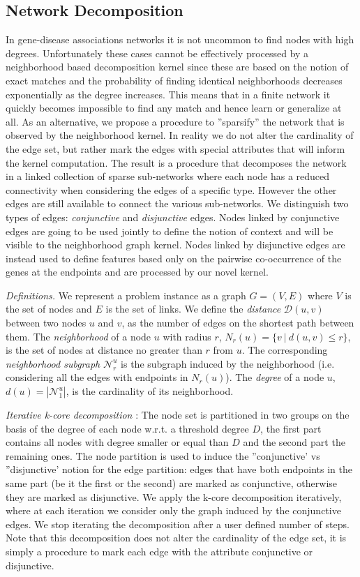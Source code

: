 \documentclass[review]{elsarticle}
\begin{document}
\subsection{Network Decomposition} 
In gene-disease associations networks it is not uncommon to find nodes with high degrees. Unfortunately these cases cannot be effectively processed by a neighborhood based decomposition kernel since these are based on the notion of exact matches and the probability of finding identical neighborhoods decreases exponentially as the degree increases. This means that in a finite network it quickly becomes impossible to find any match and hence learn or generalize at all. As an alternative, we propose a procedure to ''sparsify'' the network that is observed by the neighborhood kernel. In reality we do not alter the cardinality of the edge set, but rather mark the edges with special attributes that will inform the kernel computation. The result is a procedure that decomposes the network in a linked collection of sparse sub-networks where each node has a reduced connectivity when considering the edges of a specific type. However the other edges are still available to connect the various sub-networks. We distinguish two types of edges: {\em conjunctive} and {\em disjunctive} edges. Nodes linked by conjunctive edges are going to be used jointly to define the notion of context and will be visible to the neighborhood graph kernel. Nodes linked by disjunctive edges are instead used to define features based only on the pairwise co-occurrence of the genes at the endpoints and are processed by our novel kernel.

\textit{Definitions.} 
We represent a problem instance as a graph $G=(V,E)$ where $V$ is the set of nodes and $E$ is the set of links.
We define the \textit{distance} $\mathcal{D}(u,v)$ between two nodes $u$ and $v$, as the number of edges on the shortest path between them. The \textit{neighborhood} of a node $u$ with radius $r$, $N_r(u) = \lbrace v\ |\ d(u,v) \leq r \rbrace$, is the set of nodes at distance no greater than $r$ from $u$. The corresponding \textit{neighborhood subgraph} $\mathcal{N}_{r}^{u}$ is the  subgraph induced by the neighborhood (i.e. considering all the edges with endpoints in $N_r(u)$). The \textit{degree} of a node $u$, $d(u) = |\mathcal{N}_{1}^{u}|$, is the cardinality of its neighborhood. 


\textit{Iterative k-core decomposition} \cite{alvarez2005k}: The node set is partitioned in two groups on the basis of the degree of each node w.r.t. a threshold degree $D$, the first part contains all nodes with degree smaller or equal than $D$ and the second part the remaining ones. The node partition is used to induce the ''conjunctive' vs ''disjunctive' notion for the edge partition: edges that have both endpoints in the same part (be it the first or the second) are marked as conjunctive, otherwise they are marked as disjunctive. We apply the k-core decomposition iteratively, where at each iteration we consider only the graph induced by the conjunctive edges. We stop iterating the decomposition after a user defined number of steps. Note that this decomposition does not alter the cardinality of the edge set, it is simply a procedure to mark each edge with the attribute conjunctive or disjunctive.  
\end{document}
